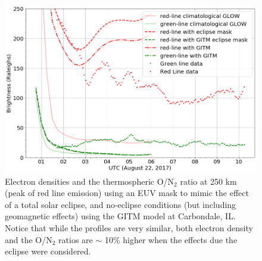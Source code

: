 \documentclass[crop=false,class=mitthesis,oneside,font=12pt]{standalone}
\begin{document}
 
   \begin{figure}[H]
 \centering\includegraphics[width=30pc]{GITM_with_GLOW_dglow.png}
 \caption{ Electron densities  and the thermospheric O/N$_2$ ratio at 250 km (peak of red line emission) using an EUV mask to mimic the effect of a total solar eclipse, and no-eclipse conditions (but including geomagnetic effects) using the GITM model at Carbondale, IL. Notice that while the profiles are very similar, both electron density and the O/N$_2$ ratios are $\sim$ 10\% higher when the effects due the eclipse were considered. }
 \label{fig:glow_est}
 \end{figure}
 
\end{document}
